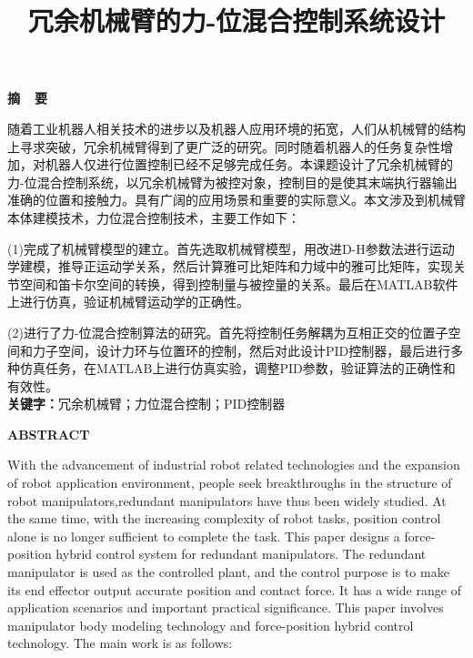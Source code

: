 \documentclass[12pt,a4paper,openany,oneside]{book}%
\title{\textbf{冗余机械臂的力-位混合控制系统设计}}
\numberwithin{equation}{chapter}%
\numberwithin{figure}{chapter}%
\begin{document}
	
	\clearpage
	
	\newpage
	
	\newpage
	\setcounter{page}{3}
	\begin{center}
		\textbf{\fontsize{16}{18}\selectfont {}摘\ \ 要}
	\end{center}
	
	随着工业机器人相关技术的进步以及机器人应用环境的拓宽，人们从机械臂的结构上寻求突破，冗余机械臂得到了更广泛的研究。同时随着机器人的任务复杂性增加，对机器人仅进行位置控制已经不足够完成任务。本课题设计了冗余机械臂的力-位混合控制系统，以冗余机械臂为被控对象，控制目的是使其末端执行器输出准确的位置和接触力。具有广阔的应用场景和重要的实际意义。本文涉及到机械臂本体建模技术，力位混合控制技术，主要工作如下：\par
(1)完成了机械臂模型的建立。首先选取机械臂模型，用改进D-H参数法进行运动学建模，推导正运动学关系，然后计算雅可比矩阵和力域中的雅可比矩阵，实现关节空间和笛卡尔空间的转换，得到控制量与被控量的关系。最后在MATLAB软件上进行仿真，验证机械臂运动学的正确性。\par
(2)进行了力-位混合控制算法的研究。首先将控制任务解耦为互相正交的位置子空间和力子空间，设计力环与位置环的控制，然后对此设计PID控制器，最后进行多种仿真任务，在MATLAB上进行仿真实验，调整PID参数，验证算法的正确性和有效性。
	\\ \textbf{\fontsize{16}{18}\selectfont {}关键字：}冗余机械臂；力位混合控制；PID控制器
	
	
	
	
	
	
	\newpage
	\begin{center}
		\textbf{\fontsize{16}{18}\selectfont {}ABSTRACT}
	\end{center}
	
	With the advancement of industrial robot related technologies and the expansion of robot application environment, people seek breakthroughs in the structure of robot manipulators,redundant manipulators have thus been widely studied. At the same time, with the increasing complexity of robot tasks, position control alone is no longer sufficient to complete the task. This paper designs a force-position hybrid control system for redundant manipulators. The redundant manipulator is used as the controlled plant, and the control purpose is to make its end effector output accurate position and contact force. It has a wide range of application scenarios and important practical significance. This paper involves manipulator body modeling technology and force-position hybrid control technology. The main work is as follows:
\end{document}
